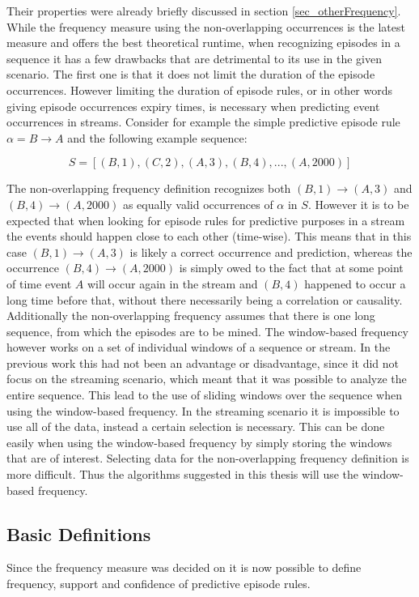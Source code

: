 Their properties were already briefly discussed in section \ref{sec_otherFrequency}. While the frequency measure using the non-overlapping occurrences is the latest measure and offers the best theoretical runtime, when recognizing episodes in a sequence it has a few drawbacks that are detrimental to its use in the given scenario. The first one is that it does not limit the duration of the episode occurrences. However limiting the duration of episode rules, or in other words giving episode occurrences expiry times, is necessary when predicting event occurrences in streams. Consider for example the simple predictive episode rule $\alpha = B \rightarrow A$ and the following example sequence: 

\begin{equation}
S = [ (B,1),(C,2),(A,3),(B,4),...,(A,2000) ] 
\end{equation}

The non-overlapping frequency definition recognizes both $(B,1) \rightarrow (A,3)$ and $(B,4) \rightarrow (A,2000)$ as equally valid occurrences of $\alpha$ in $S$. However it is to be expected that when looking for episode rules for predictive purposes in a stream the events should happen close to each other (time-wise). This means that in this case $(B,1) \rightarrow (A,3)$ is likely a correct occurrence and prediction, whereas the occurrence $(B,4) \rightarrow (A,2000)$ is simply owed to the fact that at some point of time event $A$ will occur again in the stream and $(B,4)$ happened to occur a long time before that, without there necessarily being a correlation or causality.
Additionally the non-overlapping frequency assumes that there is one long sequence, from which the episodes are to be mined. The window-based frequency however works on a set of individual windows of a sequence or stream. In the previous work this had not been an advantage or disadvantage, since it did not focus on the streaming scenario, which meant that it was possible to analyze the entire sequence. This lead to the use of sliding windows over the sequence when using the window-based frequency. In the streaming scenario it is impossible to use all of the data, instead a certain selection is necessary. This can be done easily when using the window-based frequency by simply storing the windows that are of interest. Selecting data for the non-overlapping frequency definition is more difficult. Thus the algorithms suggested in this thesis will use the window-based frequency.

\subsection{Basic Definitions}
Since the frequency measure was decided on it is now possible to define frequency, support and confidence of predictive episode rules.

